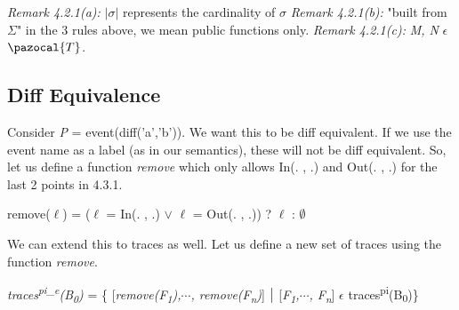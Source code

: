 \documentclass[11pt]{article}
\newcommand{\Ta}{\pazocal{T}}
\begin{document}
\vspace{6pt}
{\it Remark 4.2.1(a): }$\mid$$\sigma$$\mid$ represents the cardinality of $\sigma$\newline
{\it Remark 4.2.1(b): }"built from $\Sigma$" in the 3 rules above, we mean public functions only.\newline
{\it Remark 4.2.1(c): }{\it M, N} $\epsilon$ $\Ta$.

\subsection{Diff Equivalence}
\hspace*{14pt}{\bf A Precaution: }Consider {\it P} = event(diff('a','b')). We want this to be diff equivalent. If we use the event name as a label (as in our semantics), these will not be diff equivalent. So, let us define a function {\it remove} which only allows In(. , .) and Out(. , .) for the last 2 points in 4.3.1.
\begin{center}
  remove($\ell$) = ($\ell$ = In(. , .) $\vee$ $\ell$ = Out(. , .)) ? $\ell$ : $\emptyset$ 
\end{center}
We can extend this to traces as well. Let us define a new set of traces using the function {\it remove}.
\begin{center}
  {\it traces\textsuperscript{pi\_e}(B\textsubscript{0})} = \{ [{\it remove(F\textsubscript{1}),$\cdots$, remove(F\textsubscript{n})}] $\bigm|$ [{\it F\textsubscript{1},$\cdots$, F\textsubscript{n}}] $\epsilon$ traces\textsuperscript{pi}(B\textsubscript{0})\}
\end{center}
\end{document}
